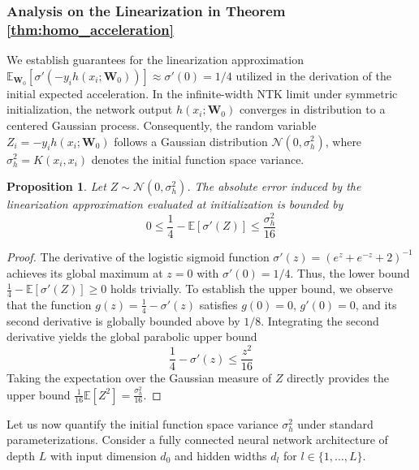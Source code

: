 \documentclass[letter,11pt]{article}
\newtheorem{proposition}{Proposition}
\begin{document}
\subsubsection{Analysis on the Linearization in Theorem \ref{thm:homo_acceleration}}

We establish guarantees for the linearization approximation $\mathbb{E}_{\mathbf{W}_0}[\sigma'(-y_i h(x_i; \mathbf{W}_0))] \approx \sigma'(0) = 1/4$ utilized in the derivation of the initial expected acceleration. In the infinite-width NTK limit under symmetric initialization, the network output $h(x_i; \mathbf{W}_0)$ converges in distribution to a centered Gaussian process. Consequently, the random variable $Z_i = -y_i h(x_i; \mathbf{W}_0)$ follows a Gaussian distribution $\mathcal{N}(0, \sigma_h^2)$, where $\sigma_h^2 = K(x_i, x_i)$ denotes the initial function space variance.

\begin{proposition}
Let $Z \sim \mathcal{N}(0, \sigma_h^2)$. The absolute error induced by the linearization approximation evaluated at initialization is bounded by
\begin{equation}
0 \le \frac{1}{4} - \mathbb{E}[\sigma'(Z)] \le \frac{\sigma_h^2}{16}
\end{equation}
\end{proposition}
\begin{proof}
The derivative of the logistic sigmoid function $\sigma'(z) = (e^z + e^{-z} + 2)^{-1}$ achieves its global maximum at $z=0$ with $\sigma'(0) = 1/4$. Thus, the lower bound $\frac{1}{4} - \mathbb{E}[\sigma'(Z)] \ge 0$ holds trivially. To establish the upper bound, we observe that the function $g(z) = \frac{1}{4} - \sigma'(z)$ satisfies $g(0) = 0$, $g'(0) = 0$, and its second derivative is globally bounded above by $1/8$. Integrating the second derivative yields the global parabolic upper bound
\begin{equation}
\frac{1}{4} - \sigma'(z) \le \frac{z^2}{16}
\end{equation}
Taking the expectation over the Gaussian measure of $Z$ directly provides the upper bound $\frac{1}{16}\mathbb{E}[Z^2] = \frac{\sigma_h^2}{16}$.
\end{proof}

Let us now quantify the initial function space variance $\sigma_h^2$ under standard parameterizations. Consider a fully connected neural network architecture of depth $L$ with input dimension $d_0$ and hidden widths $d_l$ for $l \in \{1, \dots, L\}$. 
\end{document}
